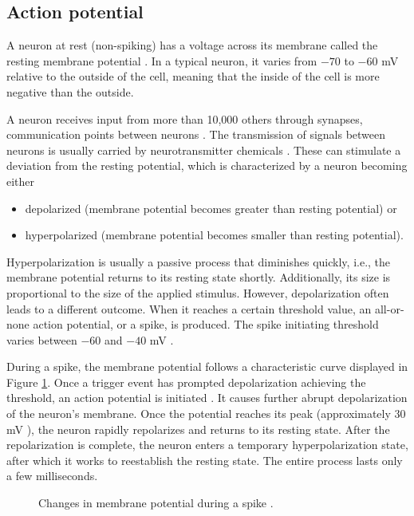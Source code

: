 \subsection{Action potential}
\label{sec:action-potential}

A neuron at rest (non-spiking) has a voltage across its membrane called the resting membrane potential \cite{KandelBook2003:6}. In a typical neuron, it varies from $-70$ to $-60$ mV relative to the outside of the cell, meaning that the inside of the cell is more negative than the outside.

A neuron receives input from more than 10,000 others through synapses, communication points between neurons \cite{IzhikevichBook2004:2}. The transmission of signals between neurons is usually carried by neurotransmitter chemicals \cite{KandelBook2003:6}. 
 These can stimulate a deviation from the resting potential, which is characterized by a neuron becoming either
\begin{itemize}
    \item depolarized (membrane potential becomes greater than resting potential) or
    
    \item hyperpolarized (membrane potential becomes smaller than resting potential).
\end{itemize}

Hyperpolarization is usually a passive process that diminishes quickly, i.e., the membrane potential returns to its resting state shortly. 
Additionally, its size is proportional to the size of the applied stimulus. However, depolarization often leads to a different outcome. When it reaches a certain threshold value, an all-or-none action potential, or a spike, is produced. The spike initiating threshold varies between $-60$ and $-40$ mV \cite{Platkiewicz2010}. 

During a spike, the membrane potential follows a characteristic curve displayed in Figure \ref{fig:action-potential}. Once a trigger event has prompted depolarization achieving the threshold, an action potential is initiated \cite{KandelBook2003:7}. It causes further abrupt depolarization of the neuron's membrane. Once the potential reaches its peak (approximately $30$ mV \cite{Izhikevich2003}), the neuron rapidly repolarizes and returns to its resting state. After the repolarization is complete, the neuron enters a temporary hyperpolarization state, after which it works to reestablish the resting state. The entire process lasts only a few milliseconds.

\begin{figure}
    \centering
    
    \caption[Membraine potential in spikes]{Changes in membrane potential during a spike \cite{ClarkBook2018:35.2}.}
    \label{fig:action-potential}
\end{figure}
